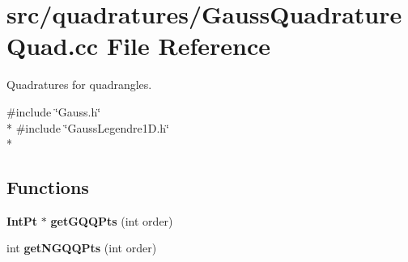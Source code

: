 \section{src/quadratures/\-Gauss\-Quadrature\-Quad.cc File Reference}
\label{GaussQuadratureQuad_8cc}


Quadratures for quadrangles.  


{\ttfamily \#include \char`\"{}Gauss.\-h\char`\"{}}\\*
{\ttfamily \#include \char`\"{}Gauss\-Legendre1\-D.\-h\char`\"{}}\\*
\subsection*{Functions}
\begin{DoxyCompactItemize}
\item 
{\bf Int\-Pt} $\ast$ {\bfseries get\-G\-Q\-Q\-Pts} (int order)\label{GaussQuadratureQuad_8cc_a9cfdd754ad7f19d7e4190f97cf81d81a}

\item 
int {\bfseries get\-N\-G\-Q\-Q\-Pts} (int order)\label{GaussQuadratureQuad_8cc_a176646b904ec6b07b5d1264da5b0bff0}

\end{DoxyCompactItemize}
